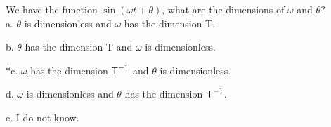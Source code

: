 
We have the function \(\sin(\omega t + \theta)\), what are the dimensions of \(\omega\) and \(\theta\)?\\

a. \(\theta\) is dimensionless and \(\omega\) has the dimension \textsf{T}.

b. \(\theta\) has the dimension \textsf{T} and \(\omega\) is dimensionless.

*c. \(\omega\) has the dimension \(\text{\textsf{T}}^{-1}\) and \(\theta\) is dimensionless.

d. \(\omega\) is dimensionless and \(\theta\) has the dimension \(\text{\textsf{T}}^{- 1}\).

e. I do not know.\\
